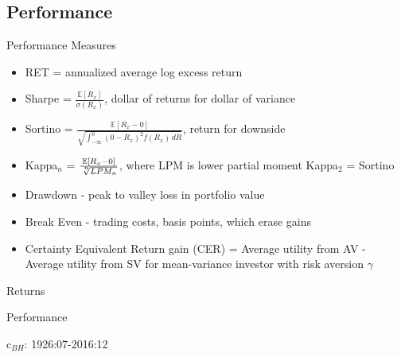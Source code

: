 \documentclass[handout]{beamer}
\begin{document}
\subsection{Performance}
\begin{frame}{Performance Measures}
	\begin{itemize}[<+->]
		\item RET = annualized average log excess return
		\item Sharpe = $\frac{\mathbb{E}[R_{x}]}{\sigma(R_{x})}$, dollar of returns for dollar of variance
		\item Sortino = $\frac{\mathbb{E}[R_{x} - 0]}{\sqrt  {\int _{{-\infty }}^{0}(0-R_{x})^{2}f(R_{x})\,dR}}$, return for downside
		\item Kappa$_{n}$ = $\frac{\mathbb{E}[R_{x} - 0]}{\sqrt[\leftroot{-2}\uproot{2}n]{LPM_{n}}}$, where LPM is lower partial moment Kappa$_{2}$ = Sortino
		\item Drawdown - peak to valley loss in portfolio value
		\item Break Even - trading costs, basis points, which erase gains
		\item Certainty Equivalent Return gain (CER) = Average utility from AV - Average utility from SV for mean-variance investor with risk aversion $\gamma$
	\end{itemize}
\end{frame}

\begin{frame}{Returns}
	\begin{adjustbox}{width=\textwidth,height=.8\textheight}
		
	\end{adjustbox}
\end{frame}
\begin{frame}{Performance}
	\begin{center}
		c$_{BH}$: 1926:07-2016:12
	\end{center}
	\vspace{-12pt}
	\begin{adjustbox}{width=\textwidth}
		
	\end{adjustbox}
\end{frame}
\end{document}

